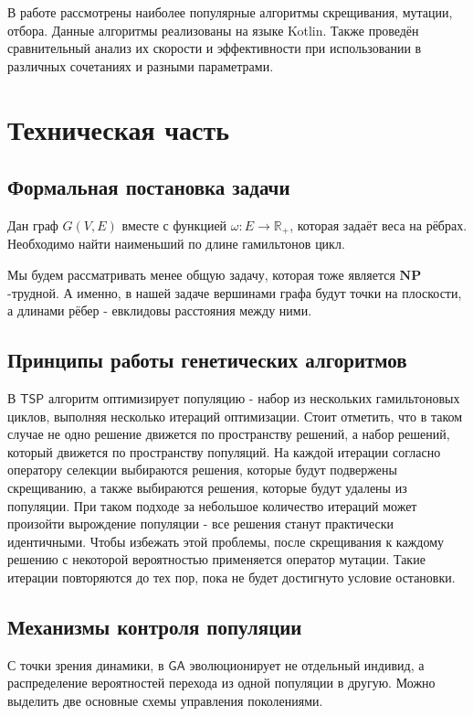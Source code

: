 \documentclass[a4paper,12pt]{article}
\begin{document}
В работе рассмотрены наиболее популярные алгоритмы скрещивания, мутации, отбора. Данные алгоритмы реализованы на языке Kotlin. Также проведён сравнительный анализ их скорости и эффективности при использовании в различных сочетаниях и разными параметрами.

\pagebreak

\section{Техническая часть}

\subsection{Формальная постановка задачи}

Дан граф $G(V, E)$ вместе с функцией $\omega: E \to \mathbb{R}_{+}$, которая задаёт веса на рёбрах. Необходимо найти наименьший по длине гамильтонов цикл.

Мы будем рассматривать менее общую задачу, которая тоже является $\mathbf{NP}$-трудной. А именно, в нашей задаче вершинами графа будут точки на плоскости, а длинами рёбер - евклидовы расстояния между ними.

\subsection{Принципы работы генетических алгоритмов}

В $\mathsf{TSP}$ алгоритм оптимизирует популяцию - набор из нескольких гамильтоновых циклов, выполняя несколько итераций оптимизации. Стоит отметить, что в таком случае не одно решение движется по пространству решений, а набор решений, который движется по пространству популяций. На каждой итерации согласно оператору селекции выбираются решения, которые будут подвержены скрещиванию, а также выбираются решения, которые будут удалены из популяции. При таком подходе за небольшое количество итераций может произойти вырождение популяции - все решения станут практически идентичными. Чтобы избежать этой проблемы, после скрещивания к каждому решению с некоторой вероятностью применяется оператор мутации. Такие итерации повторяются до тех пор, пока не будет достигнуто условие остановки.

\subsection{Механизмы контроля популяции}

С точки зрения динамики, в $\mathsf{GA}$ эволюционирует не отдельный индивид, а распределение вероятностей перехода из одной популяции в другую. Можно выделить две основные схемы управления поколениями.
\end{document}
